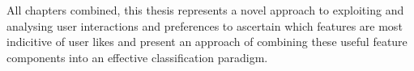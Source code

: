 All chapters combined, this thesis represents a novel approach to exploiting and analysing user interactions and preferences to ascertain 
which features are most indicitive of user likes and present an approach of combining these useful feature components into an effective 
classification paradigm.

